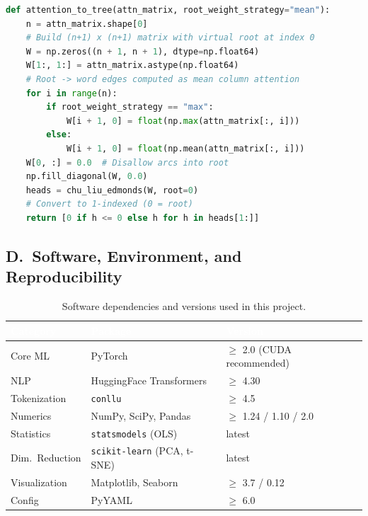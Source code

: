 \documentclass[11pt, a4paper]{article}
\begin{document}
\begin{lstlisting}[language=Python, caption={Core function from \texttt{src/utils/mst.py}}]
def attention_to_tree(attn_matrix, root_weight_strategy="mean"):
    n = attn_matrix.shape[0]
    # Build (n+1) x (n+1) matrix with virtual root at index 0
    W = np.zeros((n + 1, n + 1), dtype=np.float64)
    W[1:, 1:] = attn_matrix.astype(np.float64)
    # Root -> word edges computed as mean column attention
    for i in range(n):
        if root_weight_strategy == "max":
            W[i + 1, 0] = float(np.max(attn_matrix[:, i]))
        else:
            W[i + 1, 0] = float(np.mean(attn_matrix[:, i]))
    W[0, :] = 0.0  # Disallow arcs into root
    np.fill_diagonal(W, 0.0)
    heads = chu_liu_edmonds(W, root=0)
    # Convert to 1-indexed (0 = root)
    return [0 if h <= 0 else h for h in heads[1:]]
\end{lstlisting}

\subsection*{D.\ Software, Environment, and Reproducibility}

\begin{table}[H]
\centering
\caption{Software dependencies and versions used in this project.}
\scriptsize
\setlength{\tabcolsep}{4pt}
\begin{tabular}{l l l}
\toprule
\rowcolor{headerbg}
\textcolor{white}{Category} & \textcolor{white}{Package} & \textcolor{white}{Version} \\
\midrule
\rowcolor{rowalt}
Core ML       & PyTorch           & $\geq$ 2.0 (CUDA recommended) \\
NLP           & HuggingFace Transformers & $\geq$ 4.30 \\
\rowcolor{rowalt}
Tokenization  & \texttt{conllu}   & $\geq$ 4.5 \\
Numerics      & NumPy, SciPy, Pandas & $\geq$ 1.24 / 1.10 / 2.0 \\
\rowcolor{rowalt}
Statistics    & \texttt{statsmodels} (OLS) & latest \\
Dim.\ Reduction & \texttt{scikit-learn} (PCA, t-SNE) & latest \\
\rowcolor{rowalt}
Visualization & Matplotlib, Seaborn & $\geq$ 3.7 / 0.12 \\
Config        & PyYAML            & $\geq$ 6.0 \\
\bottomrule
\end{tabular}
\end{table}
\end{document}
